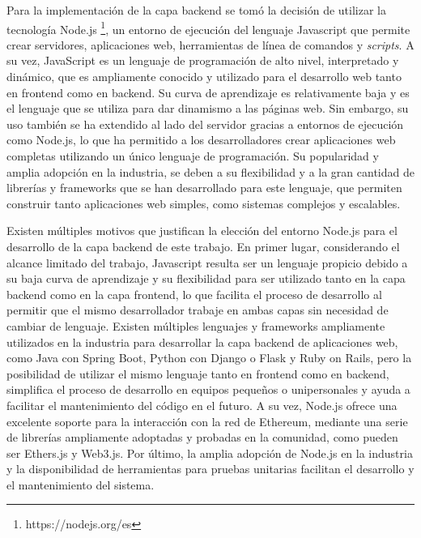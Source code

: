 Para la implementación de la capa backend se tomó la decisión de utilizar la tecnología Node.js \footnote{https://nodejs.org/es}, un entorno de ejecución del lenguaje Javascript que permite crear servidores, aplicaciones web, herramientas de línea de comandos y \textit{scripts}. A su vez, JavaScript es un lenguaje de programación de alto nivel, interpretado y dinámico, que es ampliamente conocido y utilizado para el desarrollo web tanto en frontend como en backend. Su curva de aprendizaje es relativamente baja y es el lenguaje que se utiliza para dar dinamismo a las páginas web. Sin embargo, su uso también se ha extendido al lado del servidor gracias a entornos de ejecución como Node.js, lo que ha permitido a los desarrolladores crear aplicaciones web completas utilizando un único lenguaje de programación. Su popularidad y amplia adopción en la industria, se deben a su flexibilidad y a la gran cantidad de librerías y frameworks que se han desarrollado para este lenguaje, que permiten construir tanto aplicaciones web simples, como sistemas complejos y escalables.

Existen múltiples motivos que justifican la elección del entorno Node.js para el desarrollo de la capa backend de este trabajo. En primer lugar, considerando el alcance limitado del trabajo, Javascript resulta ser un lenguaje propicio debido a su baja curva de aprendizaje y su flexibilidad para ser utilizado tanto en la capa backend como en la capa frontend, lo que facilita el proceso de desarrollo al permitir que el mismo desarrollador trabaje en ambas capas sin necesidad de cambiar de lenguaje. Existen múltiples lenguajes y frameworks ampliamente utilizados en la industria para desarrollar la capa backend de aplicaciones web, como Java con Spring Boot, Python con Django o Flask y Ruby on Rails, pero la posibilidad de utilizar el mismo lenguaje tanto en frontend como en backend, simplifica el proceso de desarrollo en equipos pequeños o unipersonales y ayuda a facilitar el mantenimiento del código en el futuro. A su vez, Node.js ofrece una excelente soporte para la interacción con la red de Ethereum, mediante una serie de librerías ampliamente adoptadas y probadas en la comunidad, como pueden ser Ethers.js y Web3.js. Por último, la amplia adopción de Node.js en la industria y la disponibilidad de herramientas para pruebas unitarias facilitan el desarrollo y el mantenimiento del sistema. 

